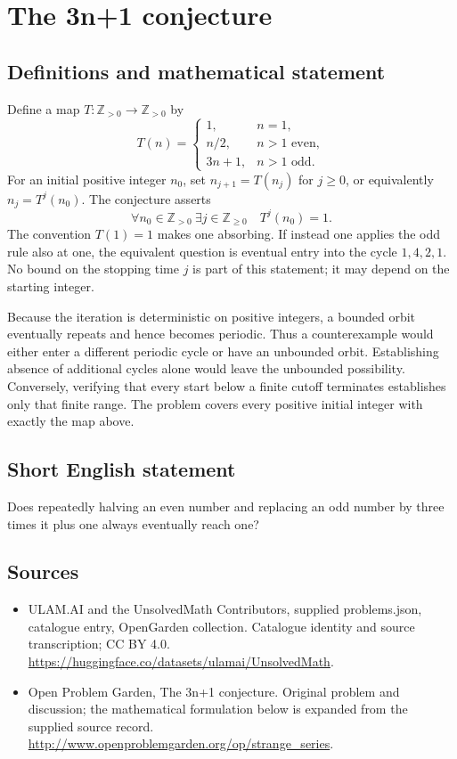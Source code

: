 \documentclass[11pt,a4paper]{article}
\begin{document}
\section*{The 3n+1 conjecture}\label{statement}

\subsection{Definitions and mathematical statement}
Define a map $T:\mathbb Z_{>0}\to\mathbb Z_{>0}$ by
\[
 T(n)=\begin{cases}
 1,&n=1,\\
 n/2,&n>1\text{ even},\\
 3n+1,&n>1\text{ odd}.
 \end{cases}
\]
For an initial positive integer $n_0$, set $n_{j+1}=T(n_j)$ for
$j\ge0$, or equivalently $n_j=T^j(n_0)$. The conjecture asserts
\[
 \forall n_0\in\mathbb Z_{>0}\ \exists j\in\mathbb Z_{\ge0}
                         \quad T^j(n_0)=1.
\]
The convention $T(1)=1$ makes one absorbing. If instead one applies
the odd rule also at one, the equivalent question is eventual entry
into the cycle $1,4,2,1$. No bound on the stopping time $j$ is part
of this statement; it may depend on the starting integer.

Because the iteration is deterministic on positive integers, a
bounded orbit eventually repeats and hence becomes periodic. Thus
a counterexample would either enter a different periodic cycle or
have an unbounded orbit. Establishing absence of additional cycles
alone would leave the unbounded possibility. Conversely, verifying
that every start below a finite cutoff terminates establishes only
that finite range. The problem covers every positive initial integer
with exactly the map above.
\subsection{Short English statement}
Does repeatedly halving an even number and replacing an odd number by three times it plus one always eventually reach one?
\subsection{Sources}
\begin{itemize}
\item[S1] ULAM.AI and the UnsolvedMath Contributors, supplied problems.json, catalogue entry, OpenGarden collection. Catalogue identity and source transcription; CC BY 4.0.
\url{https://huggingface.co/datasets/ulamai/UnsolvedMath}.
\item[S2] Open Problem Garden, The 3n+1 conjecture. Original problem and discussion; the mathematical formulation below is expanded from the supplied source record.
\url{http://www.openproblemgarden.org/op/strange_series}.
\end{itemize}
\end{document}
